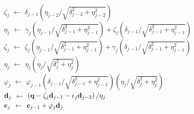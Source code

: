 \begin{algorithm2e}[t!]
{      \\
      $\zeta_j$ $\gets$ $\delta_{j-1} \left( \eta_{j-2} / \sqrt{\delta_{j-2}^2 + \eta_{j-2}^2} \right)$
      \\
      $\eta_j$ $\gets$ $\gamma_j \left( \eta_{j-1} / \sqrt{\delta_{j-1}^2 + \eta_{j-1}^2} \right) + \zeta_j \left( \delta_{j-1} / \sqrt{\delta_{j-1}^2 + \eta_{j-1}^2} \right)$%
      \\
      $\zeta_j$ $\gets$ $\zeta_j \left( \eta_{j-1} / \sqrt{\delta_{j-1}^2 + \eta_{j-1}^2} \right) + \gamma_j \left( \delta_{j-1} / \sqrt{\delta_{j-1}^2 + \eta_{j-1}^2} \right)$
      \\
      $\eta_j$ $\gets$ $\eta_j \left( \eta_j / \sqrt{\delta_j^2 + \eta_j^2} \right)$
      \\
      $\varphi_{j}$ $\gets$ $\varphi_{j-1} \left( \delta_{j-1} / \sqrt{\delta_{j-1}^2 + \eta_{j-1}^2} \right) \left( \eta_j / \sqrt{\delta_j^2 + \eta_j^2} \right) $
      \\
      $\mathbf{d}_j$ $\gets$ $\left( \mathbf{q} - \zeta_j \mathbf{d}_{j-1} - \epsilon_j \mathbf{d}_{j-2} \right) / \eta_j$
      \\
      $\mathbf{c}_j$ $\gets$ $\mathbf{c}_{j-1} + \varphi_{j} \mathbf{d}_j$
    }
    \BlankLine
\end{algorithm2e}
